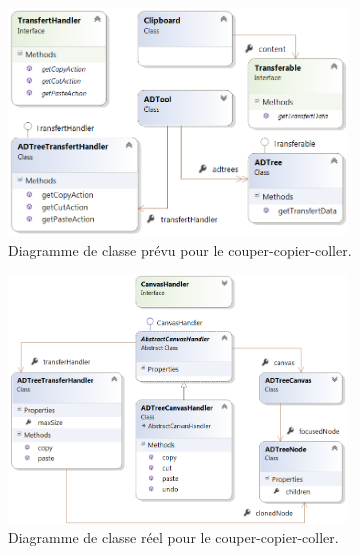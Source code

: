 	
		\begin{figure}
            \centering
                \includegraphics[width=0.8\textwidth]{figure/copiercoller.png}
            \caption{Diagramme de classe prévu pour le couper-copier-coller.}
            \label{fig:copypastePrevu}
        \end{figure}
        
        \begin{figure}
            \centering
                \includegraphics[width=0.8\textwidth]{figure/copiercollerReel.png}
            \caption{Diagramme de classe réel pour le couper-copier-coller.}
            \label{fig:copypasteReel}
        \end{figure}
       
